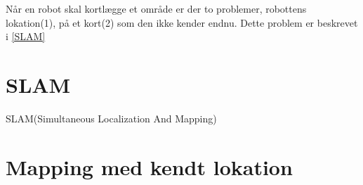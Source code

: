 Når en robot skal kortlægge et område er der to problemer, robottens lokation(1), på et kort(2) som den ikke kender endnu.
Dette problem er beskrevet i \cref{SLAM}
\section*{SLAM}\label{SLAM}
SLAM(Simultaneous Localization And Mapping)

\section*{Mapping med kendt lokation}